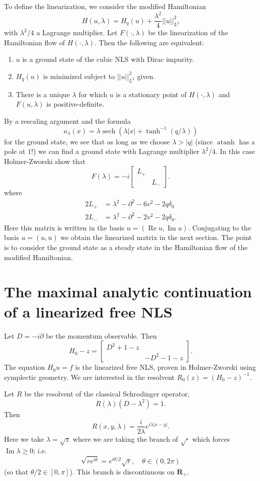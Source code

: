\documentclass[reqno,12pt,letterpaper]{amsart}
\newcommand{\RR}{\mathbf{R}}
\DeclareMathOperator{\atanh}{atanh}
\DeclareMathOperator{\sech}{sech}
\renewcommand{\Re}{\operatorname{Re}}
\renewcommand{\Im}{\operatorname{Im}}
\theoremstyle{definition}
\begin{document}
To define the linearization, we consider the modified Hamiltonian
$$H(u, \lambda) = H_q(u) + \frac{\lambda^2}{4} ||u||_{L^2}^2$$
with $\lambda^2/4$ a Lagrange multiplier. Let $F(\cdot, \lambda)$ be the linearization of the Hamiltonian flow of $H(\cdot, \lambda)$. Then the following are equivalent:
\begin{enumerate}
\item $u$ is a ground state of the cubic NLS with Dirac impurity.
\item $H_q(u)$ is minimized subject to $||u||_{L^2}^2$ given.
\item There is a unique $\lambda$ for which $u$ is a stationary point of $H(\cdot, \lambda)$ and $F(u, \lambda)$ is positive-definite.
\end{enumerate}
By a rescaling argument and the formula
$$u_\lambda(x) = \lambda \sech(\lambda|x| + \tanh^{-1}(q/\lambda))$$
for the ground state, we see that as long as we choose $\lambda > |q|$ (since $\atanh$ has a pole at $1$!) we can find a ground state with Lagrange multiplier $\lambda^2/4$.
In this case Holmer-Zworski show that
$$F(\lambda) = -i\begin{bmatrix}L_+ \\ & L_-\end{bmatrix}.$$
where
\begin{align*}
2L_+ &= \lambda^2 - \partial^2 - 6v^2 - 2q\delta_0\\
2L_- &= \lambda^2 - \partial^2 - 2v^2 - 2q\delta_0.
\end{align*}
Here this matrix is written in the basis $u = (\Re u, \Im u)$. Conjugating to the basis $u = (u, \overline u)$ we obtain the linearized matrix in the next section.
The point is to consider the ground state as a steady state in the Hamiltonian flow of the modified Hamiltonian.

\section{The maximal analytic continuation of a linearized free NLS}
Let $D = -i\partial$ be the momentum observable.
Then
$$H_0 - z = \begin{bmatrix}
D^2 + 1 - z\\
&-D^2 - 1 -z
\end{bmatrix}.$$
The equation $H_0u = f$ is the linearized free NLS, proven in Holmer-Zworski using symplectic geometry.
We are interested in the resolvent $R_0(z) = (H_0 - z)^{-1}$.

Let $R$ be the resolvent of the classical Schrodinger operator,
$$R(\lambda)(D - \lambda^2) = 1.$$
Then
$$R(x, y, \lambda) = \frac{i}{2\lambda} e^{i\lambda|x-y|}.$$
Here we take $\lambda = \sqrt z$ where we are taking the branch of $\sqrt\cdot$ which forces $\Im \lambda \geq 0$; i.e.
$$\sqrt{re^{i\theta}} = e^{i\theta/2}\sqrt r,\quad \theta \in (0, 2\pi)$$
(so that $\theta/2 \in [0, \pi]$). This branch is discontinuous on $\RR_+$.
\end{document}
